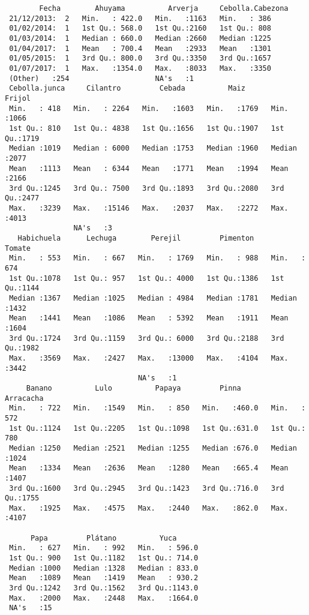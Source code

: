 \documentclass[11pt]{article}
\begin{document}
    
    \begin{verbatim}
        Fecha        Ahuyama          Arverja     Cebolla.Cabezona
 21/12/2013:  2   Min.   : 422.0   Min.   :1163   Min.   : 386    
 01/02/2014:  1   1st Qu.: 568.0   1st Qu.:2160   1st Qu.: 808    
 01/03/2014:  1   Median : 660.0   Median :2660   Median :1225    
 01/04/2017:  1   Mean   : 700.4   Mean   :2933   Mean   :1301    
 01/05/2015:  1   3rd Qu.: 800.0   3rd Qu.:3350   3rd Qu.:1657    
 01/07/2017:  1   Max.   :1354.0   Max.   :8033   Max.   :3350    
 (Other)   :254                    NA's   :1                      
 Cebolla.junca     Cilantro         Cebada          Maiz          Frijol    
 Min.   : 418   Min.   : 2264   Min.   :1603   Min.   :1769   Min.   :1066  
 1st Qu.: 810   1st Qu.: 4838   1st Qu.:1656   1st Qu.:1907   1st Qu.:1719  
 Median :1019   Median : 6000   Median :1753   Median :1960   Median :2077  
 Mean   :1113   Mean   : 6344   Mean   :1771   Mean   :1994   Mean   :2166  
 3rd Qu.:1245   3rd Qu.: 7500   3rd Qu.:1893   3rd Qu.:2080   3rd Qu.:2477  
 Max.   :3239   Max.   :15146   Max.   :2037   Max.   :2272   Max.   :4013  
                NA's   :3                                                   
   Habichuela      Lechuga        Perejil         Pimenton        Tomate    
 Min.   : 553   Min.   : 667   Min.   : 1769   Min.   : 988   Min.   : 674  
 1st Qu.:1078   1st Qu.: 957   1st Qu.: 4000   1st Qu.:1386   1st Qu.:1144  
 Median :1367   Median :1025   Median : 4984   Median :1781   Median :1432  
 Mean   :1441   Mean   :1086   Mean   : 5392   Mean   :1911   Mean   :1604  
 3rd Qu.:1724   3rd Qu.:1159   3rd Qu.: 6000   3rd Qu.:2188   3rd Qu.:1982  
 Max.   :3569   Max.   :2427   Max.   :13000   Max.   :4104   Max.   :3442  
                               NA's   :1                                    
     Banano          Lulo          Papaya         Pinna         Arracacha   
 Min.   : 722   Min.   :1549   Min.   : 850   Min.   :460.0   Min.   : 572  
 1st Qu.:1124   1st Qu.:2205   1st Qu.:1098   1st Qu.:631.0   1st Qu.: 780  
 Median :1250   Median :2521   Median :1255   Median :676.0   Median :1024  
 Mean   :1334   Mean   :2636   Mean   :1280   Mean   :665.4   Mean   :1407  
 3rd Qu.:1600   3rd Qu.:2945   3rd Qu.:1423   3rd Qu.:716.0   3rd Qu.:1755  
 Max.   :1925   Max.   :4575   Max.   :2440   Max.   :862.0   Max.   :4107  
                                                                            
      Papa         Plátano          Yuca       
 Min.   : 627   Min.   : 992   Min.   : 596.0  
 1st Qu.: 900   1st Qu.:1182   1st Qu.: 714.0  
 Median :1000   Median :1328   Median : 833.0  
 Mean   :1089   Mean   :1419   Mean   : 930.2  
 3rd Qu.:1242   3rd Qu.:1562   3rd Qu.:1143.0  
 Max.   :2000   Max.   :2448   Max.   :1664.0  
 NA's   :15                                    
    \end{verbatim}
\end{document}
